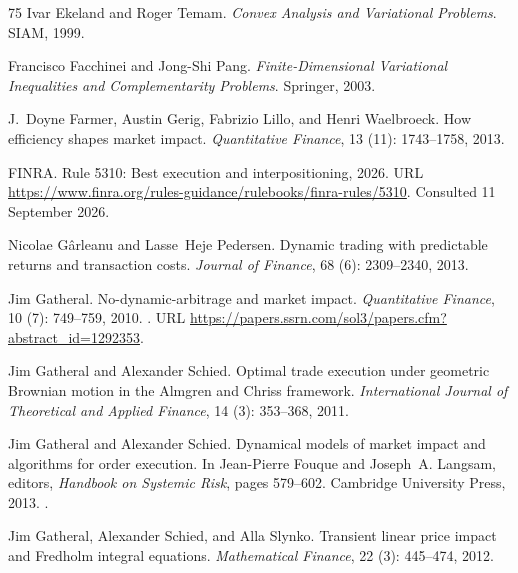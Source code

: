 \documentclass[11pt]{article}
\numberwithin{equation}{section}
\theoremstyle{definition}
\theoremstyle{remark}
\theoremstyle{definition}
\begin{document}
\begin{thebibliography}{75}
Ivar Ekeland and Roger Temam.
\newblock \emph{Convex Analysis and Variational Problems}.
\newblock SIAM, 1999.

Francisco Facchinei and Jong-Shi Pang.
\newblock \emph{Finite-Dimensional Variational Inequalities and Complementarity
  Problems}.
\newblock Springer, 2003.

J.~Doyne Farmer, Austin Gerig, Fabrizio Lillo, and Henri Waelbroeck.
\newblock How efficiency shapes market impact.
\newblock \emph{Quantitative Finance}, 13 (11): 1743--1758,
  2013.

{FINRA}.
\newblock Rule 5310: Best execution and interpositioning, 2026.
\newblock URL
  \url{https://www.finra.org/rules-guidance/rulebooks/finra-rules/5310}.
\newblock Consulted 11 September 2026.

Nicolae G{\^a}rleanu and Lasse~Heje Pedersen.
\newblock Dynamic trading with predictable returns and transaction costs.
\newblock \emph{Journal of Finance}, 68 (6): 2309--2340,
  2013.

Jim Gatheral.
\newblock No-dynamic-arbitrage and market impact.
\newblock \emph{Quantitative Finance}, 10 (7): 749--759,
  2010.
\newblock {}.
\newblock URL
  \url{https://papers.ssrn.com/sol3/papers.cfm?abstract_id=1292353}.

Jim Gatheral and Alexander Schied.
\newblock Optimal trade execution under geometric {B}rownian motion in the
  {A}lmgren and {C}hriss framework.
\newblock \emph{International Journal of Theoretical and Applied Finance},
  14 (3): 353--368, 2011.

Jim Gatheral and Alexander Schied.
\newblock Dynamical models of market impact and algorithms for order execution.
\newblock In Jean-Pierre Fouque and Joseph~A. Langsam, editors, \emph{Handbook
  on Systemic Risk}, pages 579--602. Cambridge University Press, 2013.
\newblock {}.

Jim Gatheral, Alexander Schied, and Alla Slynko.
\newblock Transient linear price impact and {F}redholm integral equations.
\newblock \emph{Mathematical Finance}, 22 (3): 445--474,
  2012.


\end{thebibliography}
\end{document}
